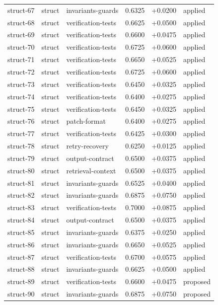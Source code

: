 \begin{center}
\begin{longtable}{llp{5.2cm}rrl}
struct-67 & struct & invariants-guards & 0.6325 & +0.0200 & applied \\
struct-68 & struct & verification-tests & 0.6625 & +0.0500 & applied \\
struct-69 & struct & verification-tests & 0.6600 & +0.0475 & applied \\
struct-70 & struct & verification-tests & 0.6725 & +0.0600 & applied \\
struct-71 & struct & verification-tests & 0.6650 & +0.0525 & applied \\
struct-72 & struct & verification-tests & 0.6725 & +0.0600 & applied \\
struct-73 & struct & verification-tests & 0.6450 & +0.0325 & applied \\
struct-74 & struct & verification-tests & 0.6400 & +0.0275 & applied \\
struct-75 & struct & verification-tests & 0.6450 & +0.0325 & applied \\
struct-76 & struct & patch-format & 0.6400 & +0.0275 & applied \\
struct-77 & struct & verification-tests & 0.6425 & +0.0300 & applied \\
struct-78 & struct & retry-recovery & 0.6250 & +0.0125 & applied \\
struct-79 & struct & output-contract & 0.6500 & +0.0375 & applied \\
struct-80 & struct & retrieval-context & 0.6500 & +0.0375 & applied \\
struct-81 & struct & invariants-guards & 0.6525 & +0.0400 & applied \\
struct-82 & struct & invariants-guards & 0.6875 & +0.0750 & applied \\
struct-83 & struct & verification-tests & 0.7000 & +0.0875 & applied \\
struct-84 & struct & output-contract & 0.6500 & +0.0375 & applied \\
struct-85 & struct & invariants-guards & 0.6375 & +0.0250 & applied \\
struct-86 & struct & invariants-guards & 0.6650 & +0.0525 & applied \\
struct-87 & struct & verification-tests & 0.6700 & +0.0575 & applied \\
struct-88 & struct & invariants-guards & 0.6625 & +0.0500 & applied \\
struct-89 & struct & verification-tests & 0.6600 & +0.0475 & proposed \\
struct-90 & struct & invariants-guards & 0.6875 & +0.0750 & proposed \\

\end{longtable}
\end{center}
